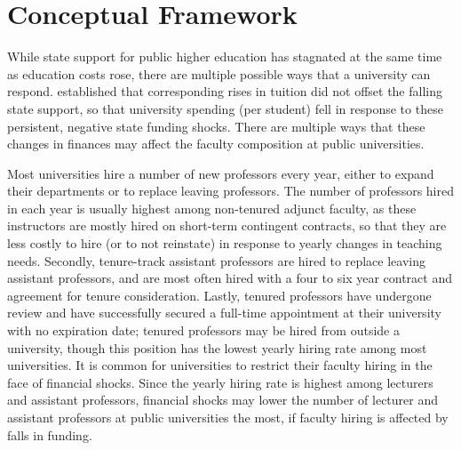\section{Conceptual Framework}
\label{sec:conceptual}

While state support for public higher education has stagnated at the same time as education costs rose, there are multiple possible ways that a university can respond.
\cite{NBERw23736} established that corresponding rises in tuition did not offset the falling state support, so that university spending (per student) fell in response to these persistent, negative state funding shocks.
There are multiple ways that these changes in finances may affect the faculty composition at public universities.

Most universities hire a number of new professors every year, either to expand their departments or to replace leaving professors.
The number of professors hired in each year is usually highest among non-tenured adjunct faculty, as these instructors are mostly hired on short-term contingent contracts, so that they are less costly to hire (or to not reinstate) in response to yearly changes in teaching needs.
Secondly, tenure-track assistant professors are hired to replace leaving assistant professors, and are most often hired with a four to six year contract and agreement for tenure consideration.
Lastly, tenured professors have undergone review and have successfully secured a full-time appointment at their university with no expiration date; tenured professors may be hired from outside a university, though this position has the lowest yearly hiring rate among most universities.
It is common for universities to restrict their faculty hiring in the face of financial shocks.
Since the yearly hiring rate is highest among lecturers and assistant professors, financial shocks may lower the number of lecturer and assistant professors at public universities the most, if faculty hiring is affected by falls in funding.

